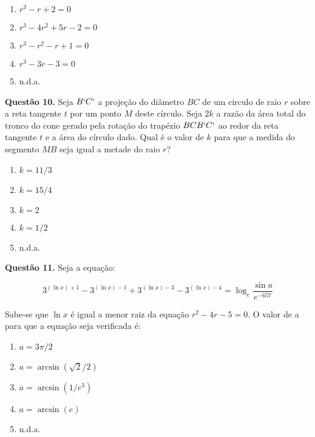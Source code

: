 \documentclass[11pt]{article}
\begin{document}
\begin{multicols}{3}
    \begin{enumerate}[\bf A (\quad)]
        \item $r^3 - r + 2 = 0$
        \item $r^3 - 4r^2 + 5r - 2 = 0$
        \item $r^3 - r^2 - r + 1 = 0$
        \item $r^3 - 3r -3 = 0$
        \item n.d.a.
    \end{enumerate}
\end{multicols}

\textbf{Questão 10.} Seja  $B`C`$  a  projeção  do  diâmetro  $BC$  de  um  circulo  de  raio  $r$  sobre  a  reta  tangente  $t$  por  um  ponto  $M$  deste  círculo.  Seja  $2k$  a  razão  da  área  total  do  tronco  do  cone  gerado  pela  rotação  do  trapézio  $BCB`C`$  ao  redor  da  reta  tangente  $t$  e  a  área  do  círculo  dado.  Qual  é  o  valor  de  $k$  para que a medida do segmento $MB$ seja igual a metade do raio $r$? 

\begin{multicols}{3}
    \begin{enumerate}[\bf A (\quad)]
        \item $k = 11/3$
        \item $k = 15/4$
        \item $k = 2$
        \item $k = 1/2$
        \item n.d.a.
    \end{enumerate}
\end{multicols}

\textbf{Questão 11.} Seja a equação:

$$
3^{(\ln x) + 1} - 3^{(\ln x) - 1} + 3^{(\ln x) - 3} - 3^{(\ln x) - 4} = \log_e \dfrac{\sin a}{e^{-657}}
$$

Sabe-se   que   $\ln x$   é   igual   a   menor   raiz   da   equação   $r^2 - 4r - 5 = 0$.  O  valor  de  a  para  que  a  equação  seja  verificada é: 

\begin{multicols}{3}
    \begin{enumerate}[\bf A (\quad)]
        \item $a = 3\pi/2$
        \item $a = \arcsin (\sqrt{2}/2)$
        \item $a = \arcsin (1/e^3)$
        \item $a = \arcsin (e)$
        \item n.d.a.
    \end{enumerate}
\end{multicols}
\end{document}
